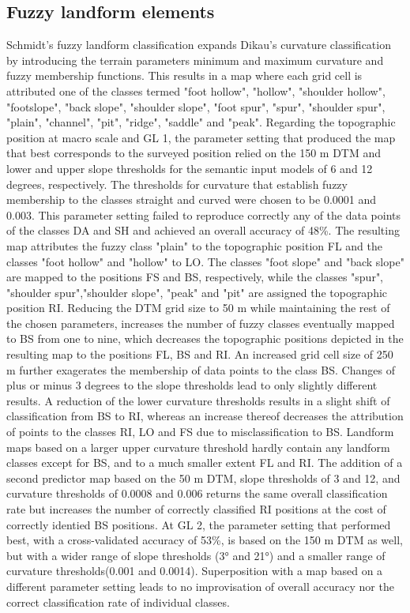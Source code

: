 \documentclass[final,1p,times,twocolumn,authoryear]{elsarticle}
\begin{document}
\subsection{Fuzzy landform elements}
Schmidt's fuzzy landform classification expands Dikau's curvature classification by introducing the terrain parameters minimum and maximum curvature and fuzzy membership functions. This results in a map where each grid cell is attributed one of the classes termed "foot hollow", "hollow", "shoulder hollow", "footslope", "back slope", "shoulder slope", "foot spur", "spur", "shoulder spur", "plain", "channel", "pit", "ridge", "saddle" and "peak".
Regarding the topographic position at macro scale and GL 1, the parameter setting that produced the map that best corresponds to the surveyed position relied on the 150 m DTM and lower and upper slope thresholds for the semantic input models of 6 and 12 degrees, respectively. The thresholds for curvature that establish fuzzy membership to the classes straight and curved were chosen to be 0.0001 and 0.003. This parameter setting failed to reproduce correctly any of the data points of the classes DA and SH and achieved an overall accuracy of 48\%. The resulting map attributes the fuzzy class "plain" to the topographic position FL and the classes "foot hollow" and "hollow" to LO. The classes "foot slope" and "back slope" are mapped to the positions FS and BS, respectively, while the classes "spur", "shoulder spur","shoulder slope", "peak" and "pit" are assigned the topographic position RI. Reducing the DTM grid size to 50 m while maintaining the rest of the chosen parameters, increases the number of fuzzy classes eventually mapped to BS from one to nine, which decreases the topographic positions depicted in the resulting map to the positions FL, BS and RI. An increased grid cell size of 250 m further exagerates the membership of data points to the class BS. Changes of plus or minus 3 degrees to the slope thresholds lead to only slightly different results. A reduction of the lower curvature thresholds results in a slight shift of classification from BS to RI, whereas an increase thereof decreases the attribution of points to the classes RI, LO and FS due to misclassification to BS. Landform maps based on a larger upper curvature threshold hardly contain any landform classes except for BS, and to a much smaller extent FL and RI. The addition of a second predictor map based on the 50 m DTM, slope thresholds of 3 and 12, and curvature thresholds of 0.0008 and 0.006 returns the same overall classification rate but increases the number of correctly classified RI positions at the cost of correctly identied BS positions. At GL 2, the parameter setting that performed best, with a cross-validated accuracy of 53\%, is based on the 150 m DTM as well, but with a wider range of slope thresholds (3° and 21°) and a smaller range of curvature thresholds(0.001 and 0.0014). Superposition with a map based on a different parameter setting leads to no improvisation of overall accuracy nor the correct classification rate of individual classes.
\end{document}
